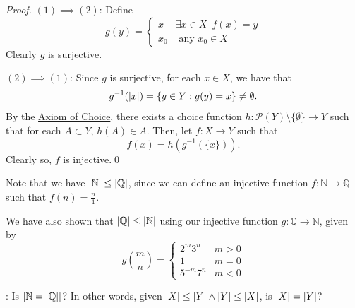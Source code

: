 \documentclass[notoc,notitlepage]{tufte-book}
\begin{document}
\begin{proof}
  $(1) \implies (2)$: Define
  \begin{equation*}
    g(y) = \begin{cases}
      x   & \exists x \in X \enspace f(x) = y \\
      x_0 & \text{ any } x_0 \in X
    \end{cases}
  \end{equation*}
  Clearly $g$ is surjective.

  \noindent $(2) \implies (1)$: Since $g$ is surjective, for each $x \in X$, we have that
  \begin{equation*}
    g^{-1}(\left|x\right|) = \{ y \in Y : g(y) = x \} \neq \emptyset.
  \end{equation*}
  By the \hyperref[axiom:zermelo_s_axiom_of_choice_v2]{Axiom of Choice}, there exists a choice function $h : \mathcal{P}(Y) \setminus \{ \emptyset \} \to Y$ such that for each $A \subset Y$, $h(A) \in A$. Then, let $f : X \to Y$ such that
  \begin{equation*}
    f(x) = h( g^{-1}(\{ x \}) ).
  \end{equation*}
  Clearly so, $f$ is injective.\qed
\end{proof}

\begin{note}
  Note that we have $\left|\mathbb{N}\right| \leq \left|\mathbb{Q}\right|$, since we can define an injective function $f: \mathbb{N} \to \mathbb{Q}$ such that $f(n) = \frac{n}{1}$.

  We have also shown that $\left|\mathbb{Q}\right| \leq \left|\mathbb{N}\right|$ using our injective function $g : \mathbb{Q} \to \mathbb{N}$, given by
  \begin{equation*}
    g\left( \frac{m}{n} \right) = \begin{cases}
      2^m 3^n    & m > 0 \\
      1          & m = 0 \\
      5^{-m} 7^n & m < 0
    \end{cases}
  \end{equation*}
\end{note}

: Is $\left|\mathbb{N} = \left|\mathbb{Q}\right|\right|$? In other words, given $\left|X\right| \leq \left|Y\right| \land \left|Y\right| \leq \left|X\right|$, is $\left|X\right| = \left|Y\right|$?

\end{document}
